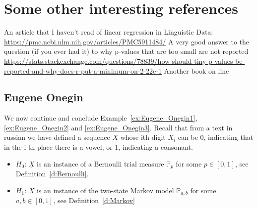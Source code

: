 	\section{Some other interesting references}

An article that I haven't read of linear regression in Linguistic Data: \url{https://pmc.ncbi.nlm.nih.gov/articles/PMC5911484/}
A very good answer to the question (if you ever had it) to why p-values that are too small are not reported \url{https://stats.stackexchange.com/questions/78839/how-should-tiny-p-values-be-reported-and-why-does-r-put-a-minimum-on-2-22e-1}
Another book on line
	\subsection{ Eugene Onegin}
	\label{ss:Eugene_Onegin4}
	We now continue and conclude Example~\ref{ex:Eugene_Onegin1}, \ref{ex:Eugene_Onegin2} and \ref{ex:Eugene_Onegin3}. 
Recall that from a text in russian we have defined a sequence $\underline X$ whose ith digit $X_i$ can be 0, indicating that in the i-th place there is a vowel, or 1, indicating a consonant.
%
%
	\begin{itemize}
		\item $H_0$: $\underline X$ is an instance of a Bernoulli trial measure $\mathbb P_p$ for some $p \in [0,1]$, see Definition~\ref{d:Bernoulli}.
		\item $H_1$: $\underline X$ is an instance of the two-state Markov model $\mathbb P_{a,b}$ for some $a,b \in [0,1]$, see Definition~\ref{d:Markov}   
	\end{itemize}
